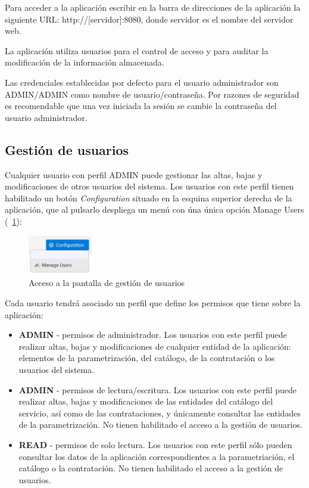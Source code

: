 Para acceder a la aplicación escribir en la barra de direcciones de la aplicación la
siguiente URL: http://[servidor]:8080, donde servidor es el nombre del servidor web.

La aplicación utiliza usuarios para el control de acceso y para auditar la
modificación de la información almacenada.

Las credenciales establecidas por defecto para el usuario administrador son ADMIN/ADMIN como nombre de usuario/contraseña. Por razones de seguridad es recomendable que una vez iniciada la sesión se cambie la contraseña del usuario administrador.
 
 
 
\subsection{Gestión de usuarios}
\label{sub:gestion-usuarios}

Cualquier usuario con perfil ADMIN puede gestionar las altas, bajas y modificaciones de otros usuarios del sistema. Los usuarios con este perfil tienen habilitado un botón \emph{Configuration} situado en la esquina superior derecha de la aplicación, que al pulsarlo despliega un menú con úna única opción Manage Users (\figurename~\ref{fig:boton-gestion-usuarios}):

\begin{figure}[H]
  \centering
  \includegraphics[width=0.25\textwidth]{imaxes/gestion-usuarios-01.png}
  \caption{Acceso a la pantalla de gestión de usuarios}
  \label{fig:boton-gestion-usuarios}
\end{figure}


Cada usuario tendrá asociado un perfil que define los permisos que tiene sobre la aplicación:
\begin{itemize}
\item \textbf{ADMIN} - permisos de administrador. Los usuarios con este perfil puede realizar altas, bajas y modificaciones de cualquier entidad de la aplicación: elementos de la parametrización, del catálogo, de la contratación o los usuarios del sistema.
\item \textbf{ADMIN} - permisos de lectura/escritura. Los usuarios con este perfil puede realizar altas, bajas y modificaciones de las entidades del catálogo del servicio, así como de las contrataciones, y únicamente consultar las entidades de la parametrización. No tienen habilitado el acceso a la gestión de usuarios.
\item \textbf{READ} - permisos de solo lectura. Los usuarios con este perfil sólo pueden consultar los datos de la aplicación correspondientes a la parametriación, el catálogo o la contratación. No tienen habilitado el acceso a la gestión de usuarios.
\end{itemize}


